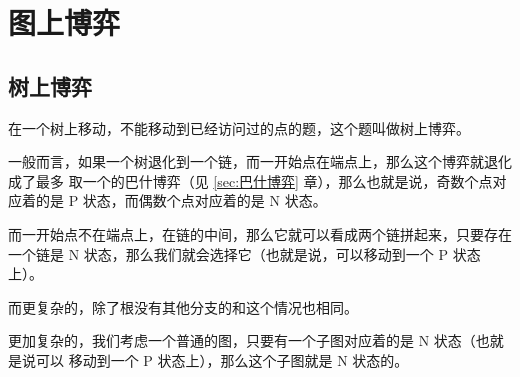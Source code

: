 \section{图上博弈}
\subsection{树上博弈}
在一个树上移动，不能移动到已经访问过的点的题，这个题叫做树上博弈。

一般而言，如果一个树退化到一个链，而一开始点在端点上，那么这个博弈就退化成了最多
取一个的巴什博弈（见 \ref{sec:巴什博弈} 章），那么也就是说，奇数个点对应着的是 P
状态，而偶数个点对应着的是 N 状态。

而一开始点不在端点上，在链的中间，那么它就可以看成两个链拼起来，只要存在一个链是
N 状态，那么我们就会选择它（也就是说，可以移动到一个 P 状态上）。

而更复杂的，除了根没有其他分支的和这个情况也相同。

更加复杂的，我们考虑一个普通的图，只要有一个子图对应着的是 N 状态（也就是说可以
移动到一个 P 状态上），那么这个子图就是 N 状态的。
